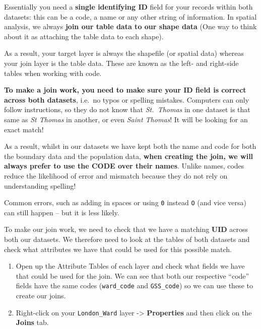 \documentclass[
]{book}
\begin{document}
Essentially you need a \textbf{single identifying ID} field for your records within both datasets: this can be a code, a name or any other string of information. In spatial analysis, we always \textbf{join our table data to our shape data} (One way to think about it as attaching the table data to each shape).

As a result, your target layer is always the shapefile (or spatial data) whereas your join layer is the table data. These are known as the left- and right-side tables when working with code.

\textbf{To make a join work, you need to make sure your ID field is correct across both datasets}, i.e.~no typos or spelling mistakes. Computers can only follow instructions, so they do not know that \emph{St.~Thomas} in one dataset is that same as \emph{St Thomas} in another, or even \emph{Saint Thomas}! It will be looking for an exact match!

As a result, whilst in our datasets we have kept both the name and code for both the boundary data and the population data, \textbf{when creating the join, we will always prefer to use the CODE over their names}. Unlike names, codes reduce the likelihood of error and mismatch because they do not rely on understanding spelling!

Common errors, such as adding in spaces or using \texttt{0} instead \texttt{O} (and vice versa) can still happen -- but it is less likely.

To make our join work, we need to check that we have a matching \textbf{UID} across both our datasets. We therefore need to look at the tables of both datasets and check what attributes we have that could be used for this possible match.

\begin{enumerate}
\def\labelenumi{\arabic{enumi}.}
\setcounter{enumi}{15}
\item
  Open up the Attribute Tables of each layer and check what fields we have that could be used for the join. We can see that both our respective ``code'' fields have the same codes (\texttt{ward\_code} and \texttt{GSS\_code}) so we can use these to create our joins.
\item
  Right-click on your \texttt{London\_Ward} layer -\textgreater{} \textbf{Properties} and then click on the \textbf{Joins} tab.
\end{enumerate}
\end{document}
